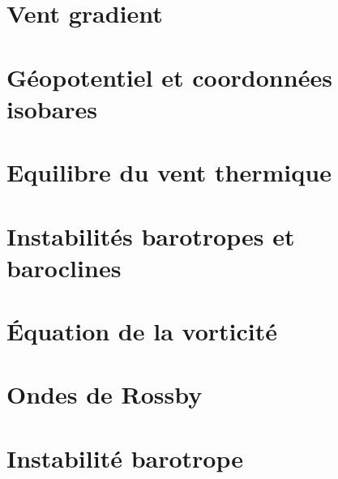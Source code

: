 \documentclass[a4paper,DIV16,10pt]{scrartcl}
\begin{document}
\newpage
\section{Vent gradient}


\newpage
\section{Géopotentiel et coordonnées isobares}


\newpage
\section{Equilibre du vent thermique}


\newpage
\section{Instabilités barotropes et baroclines}


\newpage
\section{\'Equation de la vorticité}


\newpage
\section{Ondes de Rossby}



\newpage
\section{Instabilité barotrope}

\end{document}
